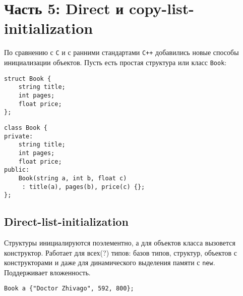 \documentclass{article}
\begin{document}
\newpage
\section*{Часть 5: Direct и copy-list-initialization}
По сравнению с \texttt{C} и с ранними стандартами \texttt{C++} добавились новые способы инициализации объектов.
Пусть есть простая структура или класс \texttt{Book}:
\begin{multicols}{2}
\begin{lstlisting}
struct Book {
    string title;
    int pages;
    float price;
};
\end{lstlisting}
\vfill\null
\columnbreak
\begin{lstlisting}
class Book {
private:
    string title;
    int pages;
    float price;
public:
    Book(string a, int b, float c) 
     : title(a), pages(b), price(c) {};
};
\end{lstlisting}
\end{multicols}

\subsection*{Direct-list-initialization}
Структуры инициалируются поэлементно, а для объектов класса вызовется конструктор. Работает для всех(?) типов: базов типов, структур, объектов с конструкторами и даже для динамического выделения памяти с \texttt{new}. Поддерживает вложенность.
\begin{lstlisting}
Book a {"Doctor Zhivago", 592, 800};
 \end{lstlisting}   
    
\end{document}
